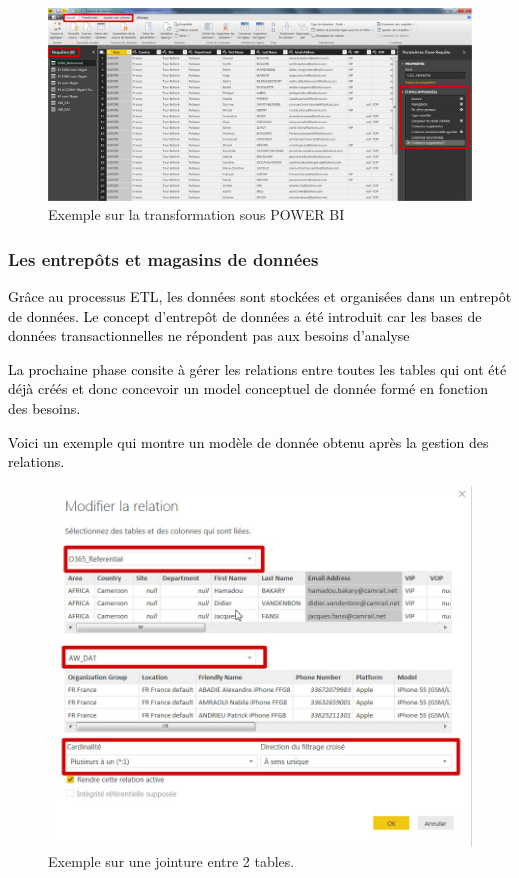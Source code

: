 \begin{figure}[H]
	\begin{center}
		\includegraphics[width=0.8\linewidth]{Projet_O365/transformaion}
\end{center}
	\caption{Exemple  sur la transformation sous POWER BI}
	\label{fig:16}	
\end{figure}



\subsubsection{Les entrepôts et magasins de données}

\textcolor{black}{Grâce au processus ETL, les données sont stockées et organisées dans un entrepôt de données. Le
concept d’entrepôt de données a été introduit car les bases de données transactionnelles ne répondent
pas aux besoins d’analyse}

\textcolor{black}{La prochaine phase consite à gérer les relations entre toutes les tables qui ont été déjà créés et donc concevoir un model conceptuel de donnée formé en fonction des besoins.}

\textcolor{black}{Voici un exemple qui montre un modèle de donnée obtenu après la gestion des relations.}

\begin{figure}[H]
	\begin{center}
		\includegraphics[width=0.7\linewidth]{Projet_O365/jointure}
\end{center}
	\caption{Exemple sur une jointure entre 2 tables.}
	\label{fig:17}	
\end{figure}

